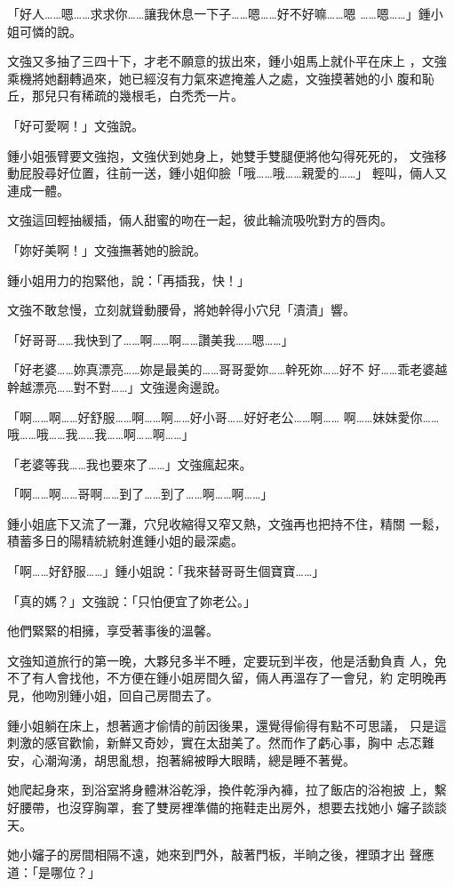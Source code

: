 「好人……嗯……求求你……讓我休息一下子……嗯……好不好嘛……嗯
……嗯……」鍾小姐可憐的說。

文強又多抽了三四十下，才老不願意的拔出來，鍾小姐馬上就仆平在床上
，文強乘機將她翻轉過來，她已經沒有力氣來遮掩羞人之處，文強摸著她的小
腹和恥丘，那兒只有稀疏的幾根毛，白禿禿一片。

「好可愛啊！」文強說。

鍾小姐張臂要文強抱，文強伏到她身上，她雙手雙腿便將他勾得死死的，
文強移動屁股尋好位置，往前一送，鍾小姐仰臉「哦……哦……親愛的……」
輕叫，倆人又連成一體。

文強這回輕抽緩插，倆人甜蜜的吻在一起，彼此輪流吸吮對方的唇肉。

「妳好美啊！」文強撫著她的臉說。

鍾小姐用力的抱緊他，說：「再插我，快！」

文強不敢怠慢，立刻就聳動腰骨，將她幹得小穴兒「漬漬」響。

「好哥哥……我快到了……啊……啊……讚美我……嗯……」

「好老婆……妳真漂亮……妳是最美的……哥哥愛妳……幹死妳……好不
好……乖老婆越幹越漂亮……對不對……」文強邊肏邊說。

「啊……啊……好舒服……啊……啊……好小哥……好好老公……啊……
啊……妹妹愛你……哦……哦……我……我……啊……啊……」

「老婆等我……我也要來了……」文強瘋起來。

「啊……啊……哥啊……到了……到了……啊……啊……」

鍾小姐底下又流了一灘，穴兒收縮得又窄又熱，文強再也把持不住，精關
一鬆，積蓄多日的陽精統統射進鍾小姐的最深處。

「啊……好舒服……」鍾小姐說：「我來替哥哥生個寶寶……」

「真的媽？」文強說：「只怕便宜了妳老公。」

他們緊緊的相擁，享受著事後的溫馨。

文強知道旅行的第一晚，大夥兒多半不睡，定要玩到半夜，他是活動負責
人，免不了有人會找他，不方便在鍾小姐房間久留，倆人再溫存了一會兒，約
定明晚再見，他吻別鍾小姐，回自己房間去了。

鍾小姐躺在床上，想著適才偷情的前因後果，還覺得偷得有點不可思議，
只是這刺激的感官歡愉，新鮮又奇妙，實在太甜美了。然而作了虧心事，胸中
忐忑難安，心潮洶湧，胡思亂想，抱著綿被睜大眼睛，總是睡不著覺。

她爬起身來，到浴室將身體淋浴乾淨，換件乾淨內褲，拉了飯店的浴袍披
上，繫好腰帶，也沒穿胸罩，套了雙房裡準備的拖鞋走出房外，想要去找她小
嬸子談談天。

她小嬸子的房間相隔不遠，她來到門外，敲著門板，半晌之後，裡頭才出
聲應道：「是哪位？」

